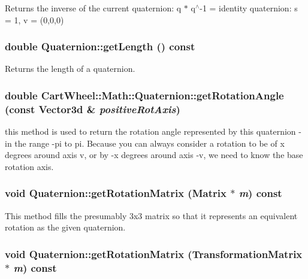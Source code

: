 \label{classCartWheel_1_1Math_1_1Quaternion_afe3c9a40a60ab64107d8dd7ab4228fce}
Returns the inverse of the current quaternion: q $\ast$ q$^\wedge$-\/1 = identity quaternion: s = 1, v = (0,0,0) \hypertarget{classCartWheel_1_1Math_1_1Quaternion_add7502f562000c496aa3a9e34ee5f3c2}{
\subsubsection[{getLength}]{\setlength{\rightskip}{0pt plus 5cm}double Quaternion::getLength () const}}
\label{classCartWheel_1_1Math_1_1Quaternion_add7502f562000c496aa3a9e34ee5f3c2}
Returns the length of a quaternion. \hypertarget{classCartWheel_1_1Math_1_1Quaternion_aa6869c5ed6433090dce37a17d2060625}{
\subsubsection[{getRotationAngle}]{\setlength{\rightskip}{0pt plus 5cm}double CartWheel::Math::Quaternion::getRotationAngle (const {\bf Vector3d} \& {\em positiveRotAxis})}}
\label{classCartWheel_1_1Math_1_1Quaternion_aa6869c5ed6433090dce37a17d2060625}
this method is used to return the rotation angle represented by this quaternion -\/ in the range -\/pi to pi. Because you can always consider a rotation to be of x degrees around axis v, or by -\/x degrees around axis -\/v, we need to know the base rotation axis. \hypertarget{classCartWheel_1_1Math_1_1Quaternion_a6fb61f1c94f1ee13fd90f75c5e1e021b}{
\subsubsection[{getRotationMatrix}]{\setlength{\rightskip}{0pt plus 5cm}void Quaternion::getRotationMatrix ({\bf Matrix} $\ast$ {\em m}) const}}
\label{classCartWheel_1_1Math_1_1Quaternion_a6fb61f1c94f1ee13fd90f75c5e1e021b}
This method fills the presumably 3x3 matrix so that it represents an equivalent rotation as the given quaternion. \hypertarget{classCartWheel_1_1Math_1_1Quaternion_ad951159735ea47e13eb728424ffb64c2}{
\subsubsection[{getRotationMatrix}]{\setlength{\rightskip}{0pt plus 5cm}void Quaternion::getRotationMatrix ({\bf TransformationMatrix} $\ast$ {\em m}) const}}
